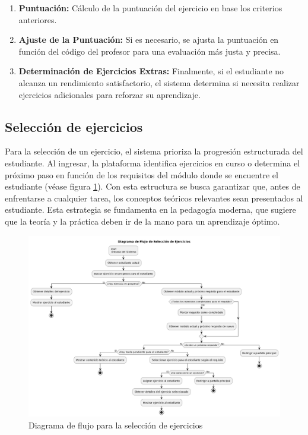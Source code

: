 \begin{enumerate}
    \item \textbf{Puntuación:} Cálculo de la puntuación del ejercicio en base los criterios anteriores.
    
    \item \textbf{Ajuste de la Puntuación:} Si es necesario, se ajusta la puntuación en función del código del profesor para una evaluación más justa y precisa.

    \item \textbf{Determinación de Ejercicios Extras:} Finalmente, si el estudiante no alcanza un rendimiento satisfactorio, el sistema determina si necesita realizar ejercicios adicionales para reforzar su aprendizaje.
\end{enumerate}

\subsection{Selección de ejercicios}

Para la selección de un ejercicio, el sistema prioriza la progresión estructurada del estudiante. Al ingresar, la plataforma identifica ejercicios en curso o determina el próximo paso en función de los requisitos del módulo donde se encuentre el estudiante (véase figura \ref{fig:seleccion}). Con esta estructura se busca garantizar que, antes de enfrentarse a cualquier tarea, los conceptos teóricos relevantes sean presentados al estudiante. Esta estrategia se fundamenta en la pedagogía moderna, que sugiere que la teoría y la práctica deben ir de la mano para un aprendizaje óptimo.

\begin{figure}[H]
\centering
\includegraphics[width=\textwidth]{imagenes/seleccionejercicios.png}
\caption{Diagrama de flujo para la selección de ejercicios}
\label{fig:seleccion}
\end{figure}

